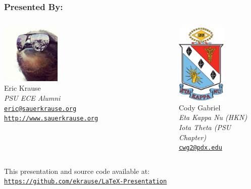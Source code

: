 \documentclass[notes=only]{beamer}
\begin{document}
\begin{frame} \frametitle{Presented By:}

	\begin{columns}[T]
			\begin{center}
				\small
				\vspace{.2in}\hspace{-.4in}
				\includegraphics[height=1.1in]{Resources/ekrause.jpg}\\
				Eric Krause\\
				\textit{PSU ECE Alumni}\\
				\texttt{\href{mailto:eric+latex@sauerkrause.org}{eric@sauerkrause.org}}
				\texttt{\href{http://www.sauerkrause.org}{http://www.sauerkrause.org}}
			\end{center}
        	\begin{center}
				\small
				\vspace{-.2in}
				\includegraphics[height=1.5in]{Resources/hkn.png}\\
				Cody Gabriel\\
				\textit{Eta Kappa Nu (HKN)}\\
				\textit{Iota Theta (PSU Chapter)}\\
				\texttt{\href{mailto:cwg2@pdx.edu}{cwg2@pdx.edu}}
			\end{center}	
        \end{columns}
        \begin{center}This presentation and source code available at:\\
        	\texttt{\href{https://github.com/ekrause/LaTeX-Presentation}{https://github.com/ekrause/LaTeX-Presentation}}\\
		\end{center}
\end{frame}
\end{document}
